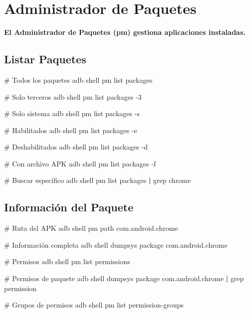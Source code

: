 \documentclass[
  doc,
  floatsintext,
  longtable,
  a4paper,
  nolmodern,
  notxfonts,
  notimes,
  12pt,
  colorlinks=true,linkcolor=blue,citecolor=blue,urlcolor=blue]{apa7}
\newenvironment{Shaded}{\begin{snugshade}}{\end{snugshade}}
\newcommand{\AttributeTok}[1]{\textcolor[rgb]{0.40,0.45,0.13}{#1}}
\newcommand{\CommentTok}[1]{\textcolor[rgb]{0.37,0.37,0.37}{#1}}
\newcommand{\ExtensionTok}[1]{\textcolor[rgb]{0.00,0.23,0.31}{#1}}
\newcommand{\FunctionTok}[1]{\textcolor[rgb]{0.28,0.35,0.67}{#1}}
\newcommand{\KeywordTok}[1]{\textcolor[rgb]{0.00,0.23,0.31}{\textbf{#1}}}
\newcommand{\NormalTok}[1]{\textcolor[rgb]{0.00,0.23,0.31}{#1}}
\begin{document}
\section{Administrador de Paquetes}\label{administrador-de-paquetes}

\textbf{El Administrador de Paquetes (pm) gestiona aplicaciones
instaladas.}

\subsection{Listar Paquetes}\label{listar-paquetes}

\begin{Shaded}
\begin{Highlighting}[]
\CommentTok{\# Todos los paquetes}
\ExtensionTok{adb}\NormalTok{ shell pm list packages}

\CommentTok{\# Solo terceros}
\ExtensionTok{adb}\NormalTok{ shell pm list packages }\AttributeTok{{-}3}

\CommentTok{\# Solo sistema}
\ExtensionTok{adb}\NormalTok{ shell pm list packages }\AttributeTok{{-}s}

\CommentTok{\# Habilitados}
\ExtensionTok{adb}\NormalTok{ shell pm list packages }\AttributeTok{{-}e}

\CommentTok{\# Deshabilitados}
\ExtensionTok{adb}\NormalTok{ shell pm list packages }\AttributeTok{{-}d}

\CommentTok{\# Con archivo APK}
\ExtensionTok{adb}\NormalTok{ shell pm list packages }\AttributeTok{{-}f}

\CommentTok{\# Buscar específico}
\ExtensionTok{adb}\NormalTok{ shell pm list packages }\KeywordTok{|} \FunctionTok{grep}\NormalTok{ chrome}
\end{Highlighting}
\end{Shaded}

\subsection{Información del Paquete}\label{informaciuxf3n-del-paquete}

\begin{Shaded}
\begin{Highlighting}[]
\CommentTok{\# Ruta del APK}
\ExtensionTok{adb}\NormalTok{ shell pm path com.android.chrome}

\CommentTok{\# Información completa}
\ExtensionTok{adb}\NormalTok{ shell dumpsys package com.android.chrome}

\CommentTok{\# Permisos}
\ExtensionTok{adb}\NormalTok{ shell pm list permissions}

\CommentTok{\# Permisos de paquete}
\ExtensionTok{adb}\NormalTok{ shell dumpsys package com.android.chrome }\KeywordTok{|} \FunctionTok{grep}\NormalTok{ permission}

\CommentTok{\# Grupos de permisos}
\ExtensionTok{adb}\NormalTok{ shell pm list permission{-}groups}
\end{Highlighting}
\end{Shaded}
\end{document}

